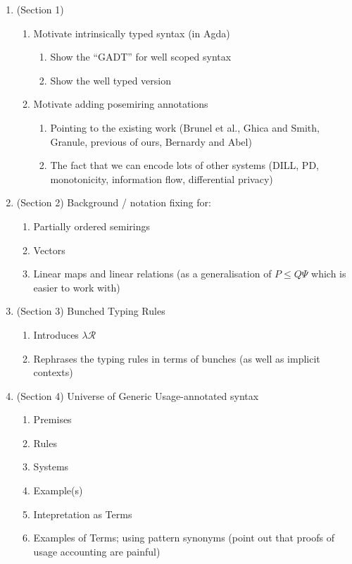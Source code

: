 \documentclass[runningheads]{llncs}
\begin{document}
%
%
%
\begin{enumerate}
\item (Section 1)
  \begin{enumerate}
  \item   Motivate intrinsically typed syntax (in Agda)
    \begin{enumerate}
    \item Show the ``GADT'' for well scoped syntax
    \item Show the well typed version
    \end{enumerate}
  \item Motivate adding posemiring annotations
    \begin{enumerate}
    \item Pointing to the existing work (Brunel et al., Ghica and Smith, Granule, previous of ours, Bernardy and Abel)
    \item The fact that we can encode lots of other systems (DILL, PD, monotonicity, information flow, differential privacy)
    \end{enumerate}
  \end{enumerate}
\item (Section 2) Background / notation fixing for:
  \begin{enumerate}
  \item Partially ordered semirings
  \item Vectors
  \item Linear maps and linear relations (as a generalisation of $P \leq Q\Psi$ which is easier to work with)
  \end{enumerate}
\item (Section 3) Bunched Typing Rules
  \begin{enumerate}
  \item Introduces $\lambda\mathcal{R}$
  \item Rephrases the typing rules in terms of bunches (as well as implicit contexts)
  \end{enumerate}
\item (Section 4) Universe of Generic Usage-annotated syntax
  \begin{enumerate}
  \item Premises
  \item Rules
  \item Systems
  \item Example(s)
  \item Intepretation as Terms
  \item Examples of Terms; using pattern synonyms (point out that proofs of usage accounting are painful)

\end{enumerate}
\end{enumerate}
\end{document}
